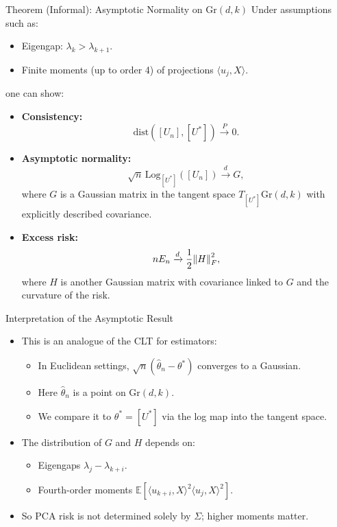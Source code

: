 \documentclass{beamer}
\newcommand{\Gr}{\mathrm{Gr}}
\newcommand{\E}{\mathbb{E}}
\newcommand{\1}{\mathbbm{1}}
\begin{document}
\begin{frame}{Theorem (Informal): Asymptotic Normality on $\Gr(d,k)$} %
  \small
  Under assumptions such as:
  \begin{itemize}
    \item Eigengap: $\lambda_k > \lambda_{k+1}$.
    \item Finite moments (up to order 4) of projections $\langle u_j, X \rangle$.
  \end{itemize}
  one can show:
  \begin{itemize}
    \item \textbf{Consistency:}
    \[
      \mathrm{dist}([U_n],[U^\ast]) \xrightarrow{P} 0.
    \]
    \item \textbf{Asymptotic normality:}
    \[
      \sqrt{n}\,\mathrm{Log}_{[U^\ast]}([U_n])
      \xrightarrow{d} G,
    \]
    where $G$ is a Gaussian matrix in the tangent space $T_{[U^\ast]}\Gr(d,k)$
    with explicitly described covariance.
    \item \textbf{Excess risk:}
    \[
      n E_n \xrightarrow{d} \frac{1}{2}\norm{H}_F^2,
    \]
    where $H$ is another Gaussian matrix with covariance linked to $G$
    and the curvature of the risk.
  \end{itemize}
\end{frame}

\begin{frame}{Interpretation of the Asymptotic Result} %
  \begin{itemize}
    \item This is an analogue of the CLT for estimators:
    \begin{itemize}
      \item In Euclidean settings, $\sqrt{n}(\hat{\theta}_n - \theta^\ast)$ converges to a Gaussian.
      \item Here $\hat{\theta}_n$ is a point on $\Gr(d,k)$.
      \item We compare it to $\theta^\ast=[U^\ast]$ via the log map into the tangent space.
    \end{itemize}
    \item The distribution of $G$ and $H$ depends on:
    \begin{itemize}
      \item Eigengaps $\lambda_j - \lambda_{k+i}$.
      \item Fourth-order moments
      $\E[\langle u_{k+i}, X\rangle^2 \langle u_j, X\rangle^2]$.
    \end{itemize}
    \item So PCA risk is not determined solely by $\Sigma$; higher moments matter.
  \end{itemize}
\end{frame}
\end{document}

